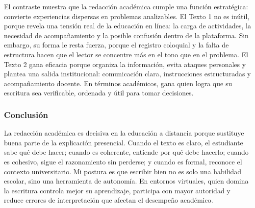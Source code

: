 El contraste muestra que la redacción académica cumple una función estratégica: convierte experiencias dispersas en problemas analizables. El Texto 1 no es inútil, porque revela una tensión real de la educación en línea: la carga de actividades, la necesidad de acompañamiento y la posible confusión dentro de la plataforma. Sin embargo, su forma le resta fuerza, porque el registro coloquial y la falta de estructura hacen que el lector se concentre más en el tono que en el problema. El Texto 2 gana eficacia porque organiza la información, evita ataques personales y plantea una salida institucional: comunicación clara, instrucciones estructuradas y acompañamiento docente. En términos académicos, gana quien logra que su escritura sea verificable, ordenada y útil para tomar decisiones.

\subsubsection{Conclusión}

La redacción académica es decisiva en la educación a distancia porque sustituye buena parte de la explicación presencial. Cuando el texto es claro, el estudiante sabe qué debe hacer; cuando es coherente, entiende por qué debe hacerlo; cuando es cohesivo, sigue el razonamiento sin perderse; y cuando es formal, reconoce el contexto universitario. Mi postura es que escribir bien no es solo una habilidad escolar, sino una herramienta de autonomía. En entornos virtuales, quien domina la escritura controla mejor su aprendizaje, participa con mayor autoridad y reduce errores de interpretación que afectan el desempeño académico.
